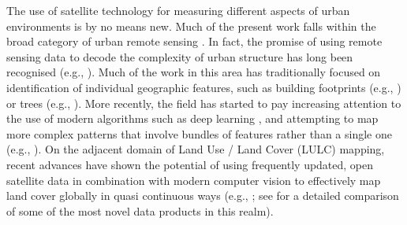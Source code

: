 The use of satellite technology for measuring different aspects of urban environments is
by no means new.
Much of the present work falls within the broad category of urban remote sensing
\citep{rashed2010remote, weng2018urban, yang2021urban}. In fact, the promise of using
remote sensing data to decode the complexity of urban structure has long been recognised
(e.g., \citealp{longley2002geographical}).
Much of the work in this area has traditionally focused on identification of individual
geographic features, such as building footprints (e.g., \citealp{microsoft2019}) or
trees (e.g., \citealp{ke2011review}). More recently, the field has started to pay
increasing attention to the use of modern algorithms such as deep learning
\citep{lai2021deep}, and attempting to map more complex patterns that involve bundles of
features rather than a single one (e.g., \citealp{kuffer2021mapping}).
On the adjacent domain of Land Use / Land Cover (LULC) mapping, recent advances have
shown the potential of using frequently updated, open satellite data in combination with
modern computer vision to effectively map land cover globally in quasi continuous ways
(e.g., \citealp{karra2021global, brown2022dynamic}; see \citealp{venter2022global} for a
detailed comparison of some of the most novel data products in this realm).

